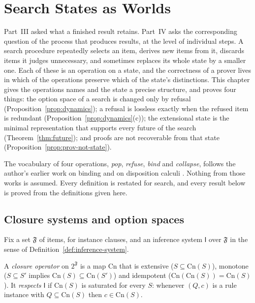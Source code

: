 \chapter{Search States as Worlds}
\label{ch:search-worlds}

Part~III asked what a finished result retains. Part~IV asks the corresponding question of the process that produces results, at the level of individual steps. A search procedure repeatedly selects an item, derives new items from it, discards items it judges unnecessary, and sometimes replaces its whole state by a smaller one. Each of these is an operation on a state, and the correctness of a prover lives in which of the operations preserve which of the state's distinctions. This chapter gives the operations names and the state a precise structure, and proves four things: the option space of a search is changed only by refusal (Proposition~\ref{prop:dynamics}); a refusal is lossless exactly when the refused item is redundant (Proposition~\ref{prop:dynamics}(c)); the extensional state is the minimal representation that supports every future of the search (Theorem~\ref{thm:future}); and proofs are not recoverable from that state (Proposition~\ref{prop:prov-not-state}).

The vocabulary of four operations, \emph{pop}, \emph{refuse}, \emph{bind} and \emph{collapse}, follows the author's earlier work on binding and on disposition calculi \cite{flyxion-binding,flyxion-disposition}. Nothing from those works is assumed. Every definition is restated for search, and every result below is proved from the definitions given here.

\section{Closure systems and option spaces}

Fix a set $\mathfrak F$ of items, for instance clauses, and an inference system $\mathsf I$ over $\mathfrak F$ in the sense of Definition~\ref{def:inference-system}.

\begin{definition}
\label{def:closure}
A \emph{closure operator} on $2^{\mathfrak F}$ is a map $\mathrm{Cn}$ that is extensive ($S\subseteq\mathrm{Cn}(S)$), monotone ($S\subseteq S'$ implies $\mathrm{Cn}(S)\subseteq\mathrm{Cn}(S')$) and idempotent ($\mathrm{Cn}(\mathrm{Cn}(S))=\mathrm{Cn}(S)$). It \emph{respects $\mathsf I$} if $\mathrm{Cn}(S)$ is saturated for every $S$: whenever $(Q,c)$ is a rule instance with $Q\subseteq\mathrm{Cn}(S)$ then $c\in\mathrm{Cn}(S)$.
\end{definition}

